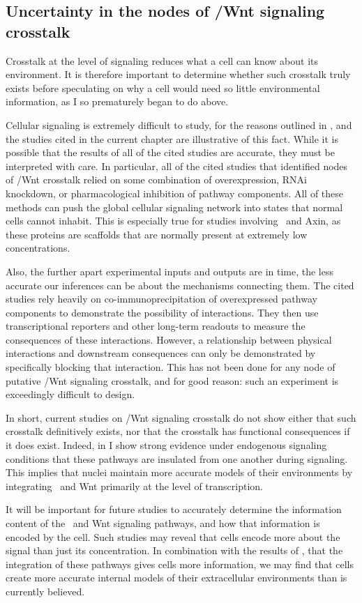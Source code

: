 \subsection{Uncertainty in the nodes of \tgfbsf/Wnt signaling crosstalk}


Crosstalk at the level of signaling reduces what a cell can know about
its environment. It is therefore important to determine whether such crosstalk
truly exists before speculating on why a cell would need so little
environmental information, as I so prematurely began to do above.


Cellular signaling is extremely difficult to study, for the reasons
outlined in , and the studies
cited in the current chapter are illustrative of this fact.
While it is possible that the results of all of the cited studies are accurate,
they must be interpreted with care. In particular, all of the cited
studies that identified nodes of \tgfbsf/Wnt crosstalk relied on
some combination of overexpression, RNAi knockdown, or pharmacological
inhibition of pathway components. All of these methods can push the
global cellular signaling network into states that normal cells
cannot inhabit. This is especially true for studies involving
\bcat\ and Axin, as these proteins are scaffolds that are normally present at extremely
low concentrations.


Also, the further apart experimental inputs and outputs
are in time, the less accurate our inferences can be about the mechanisms
connecting them. The cited studies rely heavily on co-immunoprecipitation of
overexpressed pathway components to demonstrate the possibility of
interactions. They then use transcriptional reporters
and other long-term readouts to measure the consequences of these interactions.
However, a relationship between physical interactions
and downstream consequences can only be demonstrated by specifically blocking
that interaction. This has not been done for any node of
putative \tgfbsf/Wnt signaling crosstalk, and for good reason: such an
experiment is exceedingly difficult to design.


In short, current studies on \tgfbsf/Wnt signaling crosstalk do not
show either that such crosstalk definitively exists, nor that the crosstalk
has functional consequences if it does exist.
Indeed, in  I show strong evidence under
endogenous signaling conditions that
these pathways are insulated from one another during signaling. This
implies that nuclei maintain more accurate models of their environments by
integrating \tgfbsf\ and Wnt primarily at the level of transcription.


It will be important for future studies to accurately
determine the information content of the \tgfbsf\ and Wnt signaling pathways,
and how that information is encoded by the cell. 
Such studies may reveal that cells encode more about the signal than
just its concentration.
In combination with the results of ,
that the integration of these
pathways gives cells more information, we may find that
cells create more accurate internal models of their extracellular
environments than is currently believed.

